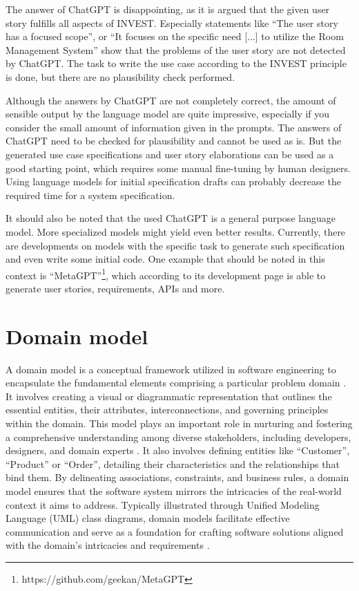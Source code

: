 \documentclass[article,onecolumn]{IEEEtran}
\begin{document}
The answer of ChatGPT is disappointing, as it is argued that the given user story fulfills all aspects of INVEST. Especially statements like ``The user story has a focused scope'', or ``It focuses on the specific need [...] to utilize the Room Management System'' show that the problems of the user story are not detected by ChatGPT. The task to write the use case according to the INVEST principle is done, but there are no plausibility check performed.

Although the answers by ChatGPT are not completely correct, the amount of sensible output by the language model are quite impressive, especially if you consider the small amount of information given in the prompts.
The answers of ChatGPT need to be checked for plausibility and cannot be used as is. But the generated use case specifications and user story elaborations can be used as a good starting point, which requires some manual fine-tuning by human designers. Using language models for initial specification drafts can probably decrease the required time for a system specification.

It should also be noted that the used ChatGPT is a general purpose language model. More specialized models might yield even better results.
Currently, there are developments on models with the specific task to generate such specification and even write some initial code. One example that should be noted in this context is ``MetaGPT''\footnote{https://github.com/geekan/MetaGPT}, which according to its development page is able to generate user stories, requirements, APIs and more.




\section{Domain model}
	A domain model is a conceptual framework utilized in software engineering to encapsulate the fundamental elements comprising a particular problem domain \cite{larman2012applying}. It involves creating a visual or diagrammatic representation that outlines the essential entities, their attributes, interconnections, and governing principles within the domain. This model plays an important role in nurturing and fostering a comprehensive understanding among diverse stakeholders, including developers, designers, and domain experts \cite{fowler2004uml}. It also involves defining entities like ``Customer'', ``Product'' or ``Order'', detailing their characteristics and the relationships that bind them. By delineating associations, constraints, and business rules, a domain model ensures that the software system mirrors the intricacies of the real-world context it aims to address. Typically illustrated through Unified Modeling Language (UML) class diagrams, domain models facilitate effective communication and serve as a foundation for crafting software solutions aligned with the domain's intricacies and requirements \cite{booch1994oo}.
\end{document}

